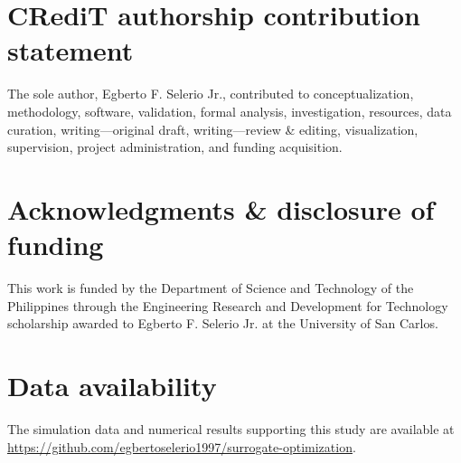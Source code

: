 \documentclass[a4paper,fleqn]{cas-sc}
\begin{document}
\section*{CRediT authorship contribution statement}

The sole author, Egberto F. Selerio Jr., contributed to conceptualization, methodology, software, validation, formal analysis, investigation, resources, data curation, writing---original draft, writing---review \& editing, visualization, supervision, project administration, and funding acquisition.

\section*{Acknowledgments \& disclosure of funding}

This work is funded by the Department of Science and Technology of the Philippines through the Engineering Research and Development for Technology scholarship awarded to Egberto F. Selerio Jr. at the University of San Carlos.

\section*{Data availability}

The simulation data and numerical results supporting this study are available at \url{https://github.com/egbertoselerio1997/surrogate-optimization}.
\end{document}
